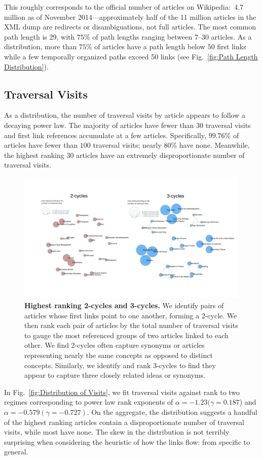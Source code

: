 This roughly corresponds to the official number of articles on Wikipedia: 
$~4.7$ million as of November 2014---approximately half of the 11 million 
articles in the XML dump are redirects or disambiguations, not full articles.
The most common path length is 29, with $75\%$ of path lengths ranging between 7--30 articles.
As a distribution, more than $75\%$ of articles have a path length below 
$50$ first links 
while a few temporally organized paths exceed 50 links 
(see Fig.~\ref{fig:Path Length Distribution}). 



\subsection{Traversal Visits}

As a distribution, the number of traversal visits by article appears to follow a decaying power law. 
The majority of articles have fewer than 30 traversal visits and
first link references accumulate at a few articles.
Specifically, $99.76\%$ of articles have fewer than $100$ traversal visits; nearly $80\%$ have none. 
Meanwhile, the highest ranking 30 articles have an extremely disproportionate number of traversal visits.

\begin{figure}[tph!]
  \includegraphics[width=\textwidth]{graphics/2_and_3_cycles.pdf}
  \caption{
    \textbf{Highest ranking 2-cycles and 3-cycles.}
We identify pairs of articles whose first links point to one another, forming
a 2-cycle. We then rank each pair of articles by the total number of 
traversal visits to gauge the most referenced groups of two articles linked
to each other. We find 2-cycles often capture synonyms or articles representing nearly the 
same concepts as opposed to distinct concepts. Similarly, we identify and 
rank 3-cycles to find they appear to capture three closely related ideas or synonyms.}
  \label{fig:cycles}
\end{figure}
In Fig.~\ref{fig:Distribution of Visits}, we fit traversal visits against rank
to two regimes corresponding to power law rank exponents of 
$\alpha = -1.23 (\gamma = 0.187$) and $\alpha = -0.579 (\gamma = -0.727)$.
On the aggregate, the distribution suggests
a handful of the highest ranking articles contain a disproportionate number of traversal visits, while most have none. The skew in the distribution is not terribly surprising when considering the heuristic of how the links flow: from specific to general. 

